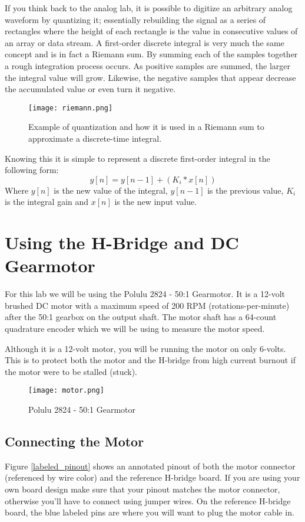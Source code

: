 \documentclass[openany,11pt,fleqn]{book} %
\begin{document}
If you think back to the analog lab, it is possible to digitize an arbitrary analog waveform by quantizing it; essentially rebuilding the signal as a series of rectangles where the height of each rectangle is the value in consecutive values of an array or data stream. A first-order discrete integral is very much the same concept and is in fact a Riemann sum. By summing each of the samples together a rough integration process occurs. As positive samples are summed, the larger the integral value will grow. Likewise, the negative samples that appear decrease the accumulated value or even turn it negative. 

\begin{figure}[tb]
    \centering\texttt{[image: riemann.png]}
    \caption{Example of quantization and how it is used in a Riemann sum to approximate a discrete-time integral.}
    \label{riemann}
\end{figure} 

Knowing this it is simple to represent a discrete first-order integral in the following form:
\begin{equation*}
y[n] = y[n-1] + (K_{i} * x[n])
\end{equation*} 
\noindent Where $y[n]$ is the new value of the integral, $y[n-1]$ is the previous value, $K_{i}$ is the integral gain and $x[n]$ is the new input value. 

\section{Using the H-Bridge and DC Gearmotor}

For this lab we will be using the Polulu 2824 - 50:1 Gearmotor. It is a 12-volt brushed DC motor with a maximum speed of 200 RPM (rotations-per-minute) after the 50:1 gearbox on the output shaft. The motor shaft has a 64-count quadrature encoder which we will be using to measure the motor speed. 

Although it is a 12-volt motor, you will be running the motor on only 6-volts. This is to protect both the motor and the H-bridge from high current burnout if the motor were to be stalled (stuck).


\begin{figure}[tb]
    \centering\texttt{[image: motor.png]}
    \caption{Polulu 2824 - 50:1 Gearmotor}
    \label{motor}
\end{figure}

\subsection{Connecting the Motor}
Figure \ref{labeled_pinout} shows an annotated pinout of both the motor connector (referenced by wire color) and the reference H-bridge board. If you are using your own board design make sure that your pinout matches the motor connector, otherwise you'll have to connect using jumper wires. On the reference H-bridge board, the blue labeled pins are where you will want to plug the motor cable in.
\end{document}
